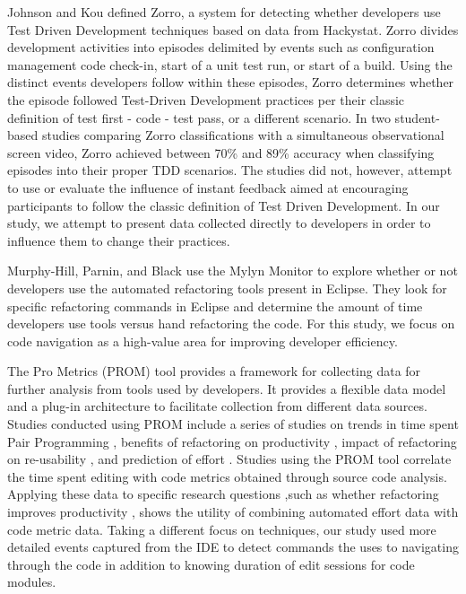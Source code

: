 \documentclass{sig-alternate}
\begin{document}
Johnson and Kou defined Zorro\cite{V:Johnson2007Automated}, a system for detecting whether developers use Test Driven Development techniques based on data from Hackystat.  Zorro divides development activities into episodes delimited by events such as configuration management code check-in, start of a unit test run, or start of a build.  Using the distinct events developers follow within these episodes, Zorro determines whether the episode followed Test-Driven Development practices per their classic definition of test first - code - test pass, or a different scenario.  In two student-based studies comparing Zorro classifications with a simultaneous observational screen video, Zorro achieved between 70\% \cite{Kou2010Operational} and 89\% \cite{V:Johnson2007Automated} accuracy when classifying episodes into their proper TDD scenarios.  The studies did not, however, attempt to use or evaluate the influence of instant feedback aimed at encouraging participants to follow the classic definition of Test Driven Development.  In our study, we attempt to present data collected directly to developers in order to influence them to change their practices.

Murphy-Hill, Parnin, and Black \cite{V:MurphyHill2012How} use the Mylyn Monitor to explore whether or not developers use the automated refactoring tools present in Eclipse.  They look for specific refactoring commands in Eclipse and determine the amount of time developers use tools versus hand refactoring the code.  For this study, we focus on code navigation as a high-value area for improving developer efficiency.

The Pro Metrics (PROM) tool provides a framework for collecting data for further analysis from tools used by developers.\cite{Coman2009Casestudy}  It provides a flexible data model and a plug-in architecture to facilitate collection from different data sources.  Studies conducted using PROM include a series of studies on trends in time spent Pair Programming \cite{Coman2008Investigating}, benefits of refactoring on productivity \cite{Moser2008Case}, impact of refactoring on re-usability \cite{Moser2006Does}, and prediction of effort \cite{Abrahamsson2007Effort}.  Studies using the PROM tool correlate the time spent editing with code metrics obtained through source code analysis.  Applying these data to specific research questions ,such as whether refactoring improves productivity \cite{Moser2008Case}, shows the utility of combining automated effort data with code metric data.  Taking a different focus on techniques, our study used more detailed events captured from the IDE  to detect commands the uses to navigating through the code in addition to knowing duration of edit sessions for code modules.
\end{document}

